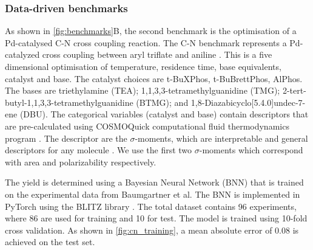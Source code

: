
 
\subsubsection{Data-driven benchmarks}

As shown in \ref{fig:benchmarks}B, the second benchmark is the optimisation of a Pd-catalysed C-N cross coupling reaction. The C-N benchmark represents a Pd-catalyzed cross coupling between aryl triflate and aniline \cite{Baumgartner2019}. This is a five dimensional optimisation of temperature, residence time, base equivalents, catalyst and base. The catalyst choices are t-BuXPhos, t-BuBrettPhos, AlPhos. The bases are triethylamine (TEA); 1,1,3,3-tetramethylguanidine (TMG); 2-tert-butyl-1,1,3,3-tetramethylguanidine (BTMG); and 1,8-Diazabicyclo[5.4.0]undec-7-ene (DBU). The categorical variables (catalyst and base) contain descriptors that are pre-calculated using COSMOQuick computational fluid thermodynamics program \cite{Loschen2012}. The descriptor are the $\sigma$-moments, which are interpretable and general descriptors for any molecule \cite{Zissimos2002}. We use the first two $\sigma$-moments which correspond with area and polarizability respectively.

The yield is determined using a Bayesian Neural Network (BNN) that is trained on the experimental data from Baumgartner et al.\cite{Baumgartner2019} The BNN is implemented in PyTorch \cite{Paszke2019} using the BLITZ library \cite{Esposito2020}. The total dataset contains 96 experiments, where 86 are used for training and 10 for test. The model is trained using 10-fold cross validation. As shown in \ref{fig:cn_training}, a mean absolute error of 0.08 is achieved on the test set.


